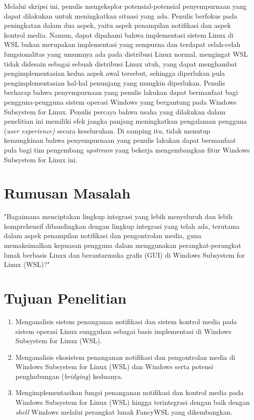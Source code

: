 Melalui skripsi ini, penulis mengeksplor potensial-potensial penyempurnaan yang dapat dilakukan untuk meningkatkan situasi yang ada. Penulis berfokus pada peningkatan dalam dua aspek, yaitu aspek penampilan notifikasi dan aspek kontrol media. Namun, dapat dipahami bahwa implementasi sistem Linux di WSL bukan merupakan implementasi yang sempurna dan terdapat celah-celah fungsionalitas yang umumnya ada pada distribusi Linux normal, mengingat WSL tidak didesain sebagai sebuah distribusi Linux utuh, yang dapat menghambat pengimplementasian kedua aspek awal tersebut, sehingga diperlukan pula pengimplementasian hal-hal penunjang yang mungkin diperlukan. Penulis berharap bahwa penyempurnaan yang penulis lakukan dapat bermanfaat bagi pengguna-pengguna sistem operasi Windows yang bergantung pada Windows Subsystem for Linux. Penulis percaya bahwa usaha yang dilakukan dalam penelitian ini memiliki efek jangka panjang meningkatkan pengalaman pengguna (\textit{user experience)} secara keseluruhan. Di samping itu, tidak menutup kemungkinan bahwa penyempurnaan yang penulis lakukan dapat bermanfaat pula bagi tim pengembang \textit{upstream} yang bekerja mengembangkan fitur Windows Subsystem for Linux ini. %

\section{Rumusan Masalah}

"Bagaimana menciptakan lingkup integrasi yang lebih menyeluruh dan lebih komprehensif dibandingkan dengan lingkup integrasi yang telah ada, terutama dalam aspek penampilan notifikasi dan pengontrolan media, guna memaksimalkan kepuasan pengguna dalam menggunakan perangkat-perangkat lunak berbasis Linux dan berantarmuka grafis (GUI) di Windows Subsystem for Linux (WSL)?"


\section{Tujuan Penelitian}

\begin{enumerate}
    \item Menganalisis sistem penanganan notifikasi dan sistem kontrol media pada sistem operasi Linux sungguhan sebagai basis implementasi di Windows Subsystem for Linux (WSL).

    \item Menganalisis ekosistem penanganan notifikasi dan pengontrolan media di Windows Subsystem for Linux (WSL) dan Windows serta potensi penghubungan (\textit{bridging}) keduanya.

    \item Mengimplementasikan fungsi penanganan notifikasi dan kontrol media pada Windows Subsystem for Linux (WSL) hingga terintegrasi dengan baik dengan \textit{shell} Windows melalui perangkat lunak FancyWSL yang dikembangkan.
\end{enumerate}


